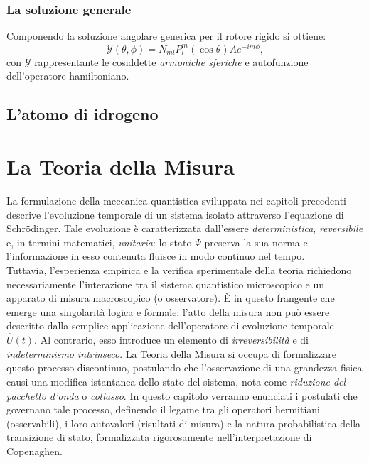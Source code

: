 \documentclass[a4paper,11pt]{report}
\begin{document}
\subsection{La soluzione generale}
Componendo la soluzione angolare generica per il rotore rigido si ottiene:
\begin{equation}
\mathcal{Y}(\theta,\phi) = N_{ml} P_l^m(\cos\theta) Ae^{-im\phi},
\end{equation}
con $\mathcal{Y}$ rappresentante le cosiddette \textit{armoniche sferiche} e autofunzione dell'operatore hamiltoniano. 


\section{L'atomo di idrogeno}


\chapter{La Teoria della Misura}
La formulazione della meccanica quantistica sviluppata nei capitoli precedenti descrive l'evoluzione temporale di un sistema isolato attraverso l'equazione di Schrödinger. Tale evoluzione è caratterizzata dall'essere \textit{deterministica}, \textit{reversibile} e, in termini matematici, \textit{unitaria}: lo stato $\Psi$ preserva la sua norma e l'informazione in esso contenuta fluisce in modo continuo nel tempo. \\

\noindent
Tuttavia, l'esperienza empirica e la verifica sperimentale della teoria richiedono necessariamente l'interazione tra il sistema quantistico microscopico e un apparato di misura macroscopico (o osservatore). È in questo frangente che emerge una singolarità logica e formale: l'atto della misura non può essere descritto dalla semplice applicazione dell'operatore di evoluzione temporale $\hat{U}(t)$. Al contrario, esso introduce un elemento di \textit{irreversibilità} e di \textit{indeterminismo intrinseco}.
La Teoria della Misura si occupa di formalizzare questo processo discontinuo, postulando che l'osservazione di una grandezza fisica causi una modifica istantanea dello stato del sistema, nota come \textit{riduzione del pacchetto d'onda} o \textit{collasso}. In questo capitolo verranno enunciati i postulati che governano tale processo, definendo il legame tra gli operatori hermitiani (osservabili), i loro autovalori (risultati di misura) e la natura probabilistica della transizione di stato, formalizzata rigorosamente nell'interpretazione di Copenaghen.
\end{document}
